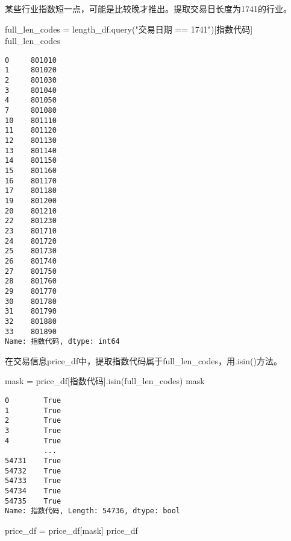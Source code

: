 \documentclass[
  letterpaper,
  DIV=11,
  numbers=noendperiod]{scrreprt}
\newenvironment{Shaded}{\begin{snugshade}}{\end{snugshade}}
\newcommand{\NormalTok}[1]{\textcolor[rgb]{0.00,0.23,0.31}{#1}}
\newcommand{\OperatorTok}[1]{\textcolor[rgb]{0.37,0.37,0.37}{#1}}
\newcommand{\StringTok}[1]{\textcolor[rgb]{0.13,0.47,0.30}{#1}}
\begin{document}
某些行业指数短一点，可能是比较晚才推出。提取交易日长度为1741的行业。

\begin{Shaded}
\begin{Highlighting}[]
\NormalTok{full\_len\_codes }\OperatorTok{=}\NormalTok{ length\_df.query(}\StringTok{"交易日期 == 1741"}\NormalTok{)[}\StringTok{\textquotesingle{}指数代码\textquotesingle{}}\NormalTok{]}
\NormalTok{full\_len\_codes}
\end{Highlighting}
\end{Shaded}

\begin{verbatim}
0     801010
1     801020
2     801030
3     801040
4     801050
7     801080
10    801110
11    801120
12    801130
13    801140
14    801150
15    801160
16    801170
17    801180
19    801200
20    801210
22    801230
23    801710
24    801720
25    801730
26    801740
27    801750
28    801760
29    801770
30    801780
31    801790
32    801880
33    801890
Name: 指数代码, dtype: int64
\end{verbatim}

在交易信息price\_df中，提取指数代码属于full\_len\_codes，用.isin()方法。

\begin{Shaded}
\begin{Highlighting}[]
\NormalTok{mask }\OperatorTok{=}\NormalTok{ price\_df[}\StringTok{\textquotesingle{}指数代码\textquotesingle{}}\NormalTok{].isin(full\_len\_codes)}
\NormalTok{mask}
\end{Highlighting}
\end{Shaded}

\begin{verbatim}
0        True
1        True
2        True
3        True
4        True
         ... 
54731    True
54732    True
54733    True
54734    True
54735    True
Name: 指数代码, Length: 54736, dtype: bool
\end{verbatim}

\begin{Shaded}
\begin{Highlighting}[]
\NormalTok{price\_df }\OperatorTok{=}\NormalTok{ price\_df[mask]}
\NormalTok{price\_df}
\end{Highlighting}
\end{Shaded}
\end{document}
